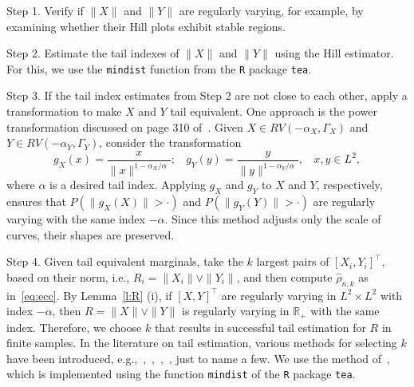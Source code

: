 \documentclass[lineno]{biometrika}
\newcommand \ag{\alpha}
\newcommand \Gg{\Gamma}
\begin{document}
\medskip

\noindent Step 1. Verify if $\|X\|$ and $\|Y\|$ are regularly varying, for example, by examining whether their  Hill plots  exhibit stable regions.

\medskip

\noindent Step 2. Estimate the tail indexes of $\|X\|$ and $\|Y\|$  using the Hill estimator. For this, we use the {\tt mindist} function from the {\tt R} package {\tt tea}.

\medskip

\noindent Step 3. If the tail index estimates from Step 2 are not close to each other, apply a transformation to make $X$ and $Y$ tail equivalent. One approach is the power transformation discussed on page 310 of~\citet{resnick:2007}. Given $X \in RV(-\ag_X, \Gg_X)$ and $Y \in RV(-\ag_Y, \Gg_Y)$, consider the transformation
\begin{equation} \label{eq:tr}
g_X(x) = \frac{x}{\|x\|^{1-{\ag_X}/\ag}}; \ \ \ \ g_Y(y) = \frac{y}{\|y\|^{1-{\ag_Y}/\ag}},\ \ \ \ x,y \in L^2,
\end{equation}
where $\ag$ is a desired tail index. Applying $g_X$ and $g_Y$ to $X$ and $Y$,
respectively, ensures that $P(\|g_X(X)\|>\cdot)$ and $P(\|g_Y(Y)\|>\cdot)$
are regularly varying with the same index $-\ag$. Since this method adjusts
only the scale of curves, their shapes are preserved.


\medskip

\noindent Step 4. Given tail equivalent marginals, take the $k$ largest pairs of $[X_i, Y_i]^{\top}$, based on their norm, i.e., $R_i = \|X_i\| \vee \|Y_i\|$, and then compute $\hat{\rho}_{n,k}$ as in~\eqref{eq:ecc}.  By Lemma~\ref{l:R} (i), if $[X, Y]^{\top}$ are regularly varying in $L^2 \times L^2$ with index $-\alpha$, then $R = \|X\| \vee \|Y\|$ is regularly varying in $\mathbb{R}_+$ with the same index. Therefore, we choose $k$ that results in successful tail estimation for $R$ in finite samples. In the literature on tail estimation, various methods for selecting $k$ have been introduced, e.g.,~\citet{hall:Welsh:1985},~\citet{hall:1990},~\citet{drees:kaufmann:1998},~\citet{danielsson:deHaan:Peng:deVries:2001}, just to name a few.  We use  the method of~\citet{danielsson:Ergun:deHaan:deVries:2016}, which  is implemented using the function {\tt mindist} of the {\tt R} package {\tt tea}.



\medskip
\end{document}

